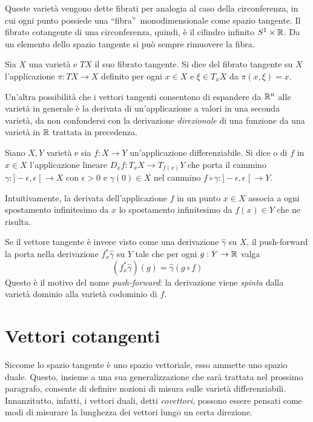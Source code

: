 Queste varietà vengono dette fibrati per analogia al caso della circonferenza, in cui ogni punto possiede una \textquotedblleft fibra\textquotedblright\ monodimensionale come spazio tangente. Il fibrato cotangente di una circonferenza, quindi, è il cilindro infinito $S^1 \times \mathbb{R}$. Da un elemento dello spazio tangente si può sempre rimuovere la fibra.
\begin{definition}
  Sia $X$ una varietà e $T X$ il suo fibrato tangente. Si dice  del fibrato tangente su $X$ l'applicazione $\pi: TX \to X$ definito per ogni $x \in X$ e $\xi \in T_x X$ da $\pi(x,\xi) = x$.
\end{definition}

Un'altra possibilità che i vettori tangenti consentono di espandere da $\mathbb{R}^{n}$ alle varietà in generale è la derivata di un'applicazione a valori in una seconda varietà, da non confondersi con la derivazione \emph{direzionale} di una funzione da una varietà in $\mathbb{R}$ trattata in precedenza.
\begin{definition}
  Siano $X,Y$ varietà e sia $f:X\to Y$ un'applicazione differenziabile. Si dice  o  di $f$ in $x \in X$ l'applicazione lineare $D_x f:T_x X \to T_{f(x)}Y$ che porta il cammino $\gamma: ]-\epsilon, \epsilon\;[\ \to X$ con $\epsilon>0$ e $\gamma(0) \in X$ nel cammino $f \circ \gamma:]-\epsilon, \epsilon\;[\ \to Y$.
\end{definition}
\begin{remark}
  Intuitivamente, la derivata dell'applicazione $f$ in un punto $x \in X$ associa a ogni spostamento infinitesimo da $x$ lo spostamento infinitesimo da $f(x) \in Y$ che ne risulta.
\end{remark}
\begin{remark}
  Se il vettore tangente è invece visto come una derivazione $\hat{\gamma}$ su $X$, il push-forward la porta nella derivazione $f^*_x \hat{\gamma}$ su $Y$ tale che per ogni $g:Y\to \mathbb{R}$ valga
  \begin{equation*}
    (f^*_x \hat{\gamma})(g) = \hat{\gamma} (g \circ f) 
  \end{equation*} 
  Questo è il motivo del nome \emph{push-forward}: la derivazione viene \emph{spinta} dalla varietà dominio alla varietà codominio di $f$. 
\end{remark}

\section{Vettori cotangenti}
Siccome lo spazio tangente è uno spazio vettoriale, esso ammette uno spazio duale. Questo, insieme a una sua generalizzazione che sarà trattata nel prossimo paragrafo, consente di definire nozioni di misura sulle varietà differenziabili. Innanzitutto, infatti, i vettori duali, detti \emph{covettori}, possono essere pensati come modi di misurare la lunghezza dei vettori lungo un certa direzione.

